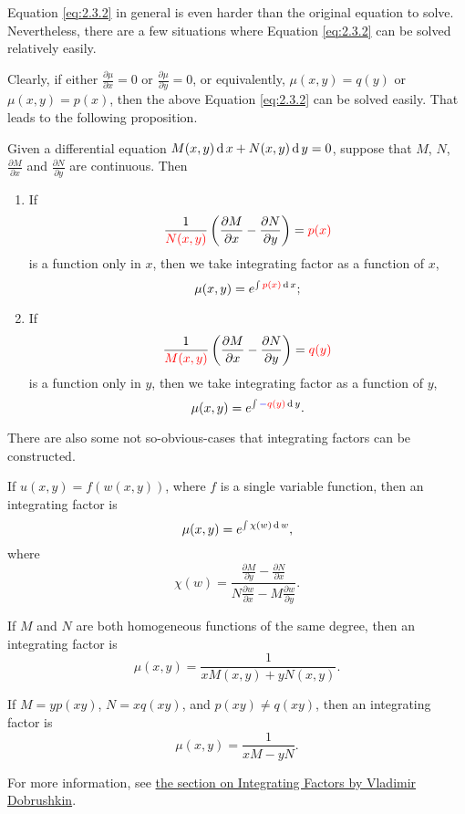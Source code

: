 Equation \ref{eq:2.3.2} in general is even harder than the original equation to solve. Nevertheless, there are a few situations where Equation \ref{eq:2.3.2} can be solved relatively easily.

Clearly, if either $\frac{\partial \mu}{\partial x} = 0$ or $\frac{\partial \mu}{\partial y} = 0$, or equivalently, $\mu(x, y)=q(y)$ or $\mu(x, y)=p(x)$, then the above Equation \ref{eq:2.3.2} can be solved easily. That leads to the following proposition.

\begin{proposition}\label{prop:intfactor} Given a differential equation $ M(x,y) \operatorname{d} x +  N(x,y) \operatorname{d} y =0$, suppose that $M$, $N$, $\frac{\partial M}{\partial x}$ and $\frac{\partial N}{\partial y}$ are continuous. Then  
\begin{enumerate}[label={Type \Roman*:}, leftmargin=*, align=left]
  \item If 
  \[\frac{1}{{\color{red}N(x,y)}}\left(\frac{\partial M}{\partial x}-\frac{\partial N}{\partial y}\right)={\color{red}p(x)}\]
  is a function {\color{red}only in $x$}, then we take integrating factor as a function of $x$, \[\mu(x,y)=e^{\int {\color{red}p(x)}\operatorname{d} x};\]
  \item If 
  \[\frac{1}{{\color{red}M(x,y)}}\left(\frac{\partial M}{\partial x}-\frac{\partial N}{\partial y}\right)={\color{red}q(y)}\]
  is a function {\color{red} only in $y$}, then we take integrating factor as a function of $y$,
  \[\mu(x,y)=e^{\int {\color{blue}-}{\color{red}q(y)}\operatorname{d} y}.\]
\end{enumerate}
\end{proposition}

\begin{remark}
	There are also some not so-obvious-cases that integrating factors can be constructed.
  
  If $u(x, y)=f(w(x, y))$, where $f$ is a single variable function, then an integrating factor is
  \[\mu(x, y)= e^{\int\chi(w)\operatorname{d} w},\]
  where
  \[
  \chi(w)=\dfrac{\frac{\partial M}{\partial y} - \frac{\partial N}{\partial x}}
  {N\frac{\partial w}{\partial x}-M\frac{\partial w}{\partial y}}.
  \]

  If $M$ and $N$ are both homogeneous functions of the same degree, then an integrating factor is
  \[\mu(x,y) = \frac{1}{x M(x,y) + y N(x,y)}.
  \]

  If $M=yp(xy)$, $N=xq(xy)$, and $p(xy)\ne q(xy)$, then an integrating factor is
  \[\mu(x, y)=\frac{1}{xM-yN}.\]

  For more information, see \href{https://www.cfm.brown.edu/people/dobrush/am33/Mathematica/ch2/intfactor.html}{the section on Integrating Factors by Vladimir Dobrushkin}.
\end{remark}	

